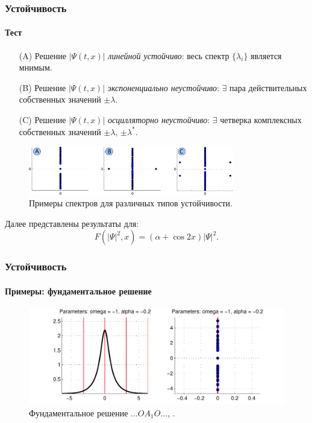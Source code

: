 \documentclass{beamer}
\begin{document}
\begin{frame}
	\frametitle{Устойчивость}
	\framesubtitle{Тест}
	
	\begin{enumerate}
		\item[(A)] Решение $|\Psi(t, x)|$ {\it {\color{forestgreen} линейной устойчиво}}: весь спектр $\{ \lambda_i \}$ является мнимым.
		\item[(B)] Решение $|\Psi(t, x)|$ {\it {\color{fireenginered} экспоненциально неустойчиво}}: $\exists$ пара действительных собственных значений $\pm \lambda$.
		\item[(C)] Решение $|\Psi(t, x)|$ {\it {\color{fireenginered} осцилляторно неустойчиво}}: $\exists$ четверка комплексных собственных значений $\pm \lambda$, $\pm \lambda^*$.
	\end{enumerate}
	
	\begin{figure}
		\includegraphics[width=0.8\textwidth]{pic/test.pdf}
		\caption{Примеры спектров для различных типов устойчивости.}
		\label{pic:test}
	\end{figure}
	
	Далее представлены результаты для:
	$$F(|\Psi|^2, x) = (\alpha + \cos 2x) |\Psi|^2.$$
\end{frame}

\begin{frame}
	\frametitle{Устойчивость}
	\framesubtitle{Примеры: фундаментальное решение}
	
	\begin{figure}
		\includegraphics[width=1\textwidth]{pic/example_1.pdf}
		\caption{Фундаментальное решение $\dots O A_1 O \dots$, {\it \color{forestgreen}{линейно устойчиво}}.}
		\label{pic:example_1}
	\end{figure}
\end{frame}
\end{document}
